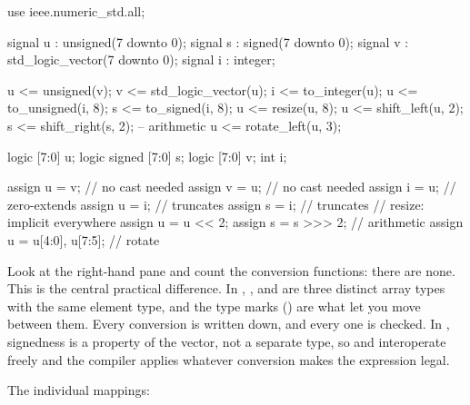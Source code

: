 
\begin{rosetta}
\begin{rleft}
use ieee.numeric_std.all;

signal u  : unsigned(7 downto 0);
signal s  : signed(7 downto 0);
signal v  : std_logic_vector(7 downto 0);
signal i  : integer;

u <= unsigned(v);
v <= std_logic_vector(u);
i <= to_integer(u);
u <= to_unsigned(i, 8);
s <= to_signed(i, 8);
u <= resize(u, 8);
u <= shift_left(u, 2);
s <= shift_right(s, 2);  -- arithmetic
u <= rotate_left(u, 3);
\end{rleft}
\begin{rright}
logic        [7:0] u;
logic signed [7:0] s;
logic        [7:0] v;
int                i;

assign u = v;         // no cast needed
assign v = u;         // no cast needed
assign i = u;         // zero-extends
assign u = i;         // truncates
assign s = i;         // truncates
// resize: implicit everywhere
assign u = u << 2;
assign s = s >>> 2;   // arithmetic
assign u = {u[4:0], u[7:5]}; // rotate
\end{rright}
\end{rosetta}

Look at the right-hand pane and count the conversion functions: there are none.
This is the central practical difference. In \VHDL{}, ,
 and  are three distinct array types with
the same element type, and the type marks () are what let you
move between them. Every conversion is written down, and every one is checked.
In \SV{}, signedness is a property of the vector, not a separate type, so
 and  interoperate freely and the
compiler applies whatever conversion makes the expression legal.

The individual mappings:

